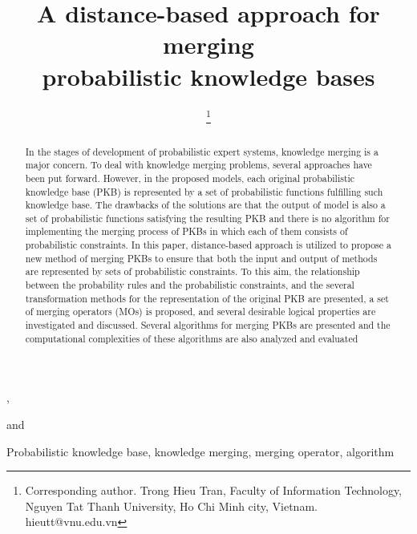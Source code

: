 \documentclass[]{iosart2c}
\begin{document}
  \begin{frontmatter}

    \title{A distance-based approach for merging\\
    probabilistic knowledge bases}


    \author[A,C]{ },
    \author[B,D]{ }
    and
    \author[A]{ %
    \thanks{Corresponding author. Trong Hieu Tran, Faculty of Information Technology, Nguyen Tat Thanh University,
      Ho Chi Minh city, Vietnam. hieutt@vnu.edu.vn}}


    \address[A]{University of Engineering and Technology, Vietnam National University, Hanoi, Vietnam}
    \address[B]{Faculty of Computer Science and Management, Wroclaw University of Science and Technology, Poland}
    \address[C]{Faculty of Information Technology, Namdinh University of Technology Education, Vietnam}
    \address[D]{Faculty of Information Technology, Nguyen Tat Thanh University, Ho Chi Minh city, Vietnam}

    \begin{abstract}
      In the stages of development of probabilistic expert systems, knowledge merging is a major concern. To deal with
      knowledge merging problems, several approaches have been put forward. However, in the proposed models, each
      original probabilistic knowledge base (PKB) is represented by a set of probabilistic functions fulfilling such
      knowledge base. The drawbacks of the solutions are that the output of model is also a set of probabilistic
      functions satisfying the resulting PKB and there is no algorithm for implementing the merging process of PKBs in
      which each of them consists of probabilistic constraints. In this paper, distance-based approach is utilized to
      propose a new method of merging PKBs to ensure that both the input and output of methods are represented by sets
      of probabilistic constraints. To this aim, the relationship between the probability rules and the probabilistic
      constraints, and the several transformation methods for the representation of the original PKB are presented, a
      set of merging operators (MOs) is proposed, and several desirable logical properties are investigated and
      discussed. Several algorithms for merging PKBs are presented and the computational complexities of these
      algorithms are also analyzed and evaluated

    \end{abstract}

    \begin{keyword}
      Probabilistic knowledge base, knowledge merging, merging operator, algorithm
    \end{keyword}

  \end{frontmatter}
\end{document}

